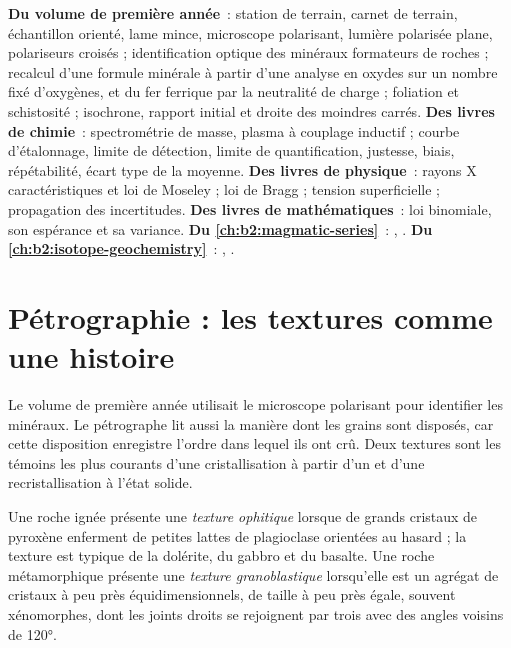 \begin{recall}
\textbf{Du volume de première année}~: station de terrain, carnet de terrain, échantillon orienté, lame mince,
microscope polarisant, lumière polarisée plane, polariseurs croisés ; identification optique des minéraux
formateurs de roches ; recalcul d'une formule minérale à partir d'une analyse en oxydes sur un nombre fixé
d'oxygènes, et du fer ferrique par la neutralité de charge ; foliation et schistosité ; isochrone, rapport
initial et droite des moindres carrés. \textbf{Des livres de chimie}~: spectrométrie de masse, plasma à
couplage inductif ; courbe d'étalonnage, limite de détection, limite de quantification, justesse, biais,
répétabilité, écart type de la moyenne. \textbf{Des livres de physique}~: rayons X caractéristiques et loi de
Moseley ; loi de Bragg ; tension superficielle ; propagation des incertitudes.
\textbf{Des livres de mathématiques}~: loi binomiale, son espérance et sa variance.
\textbf{Du \cref{ch:b2:magmatic-series}}~: , .
\textbf{Du \cref{ch:b2:isotope-geochemistry}}~: , .
\end{recall}

\section{Pétrographie : les textures comme une histoire}\label{sec:b2:field-lab-methods-2:petrography}

Le volume de première année utilisait le microscope polarisant pour identifier les minéraux. Le pétrographe lit
aussi la manière dont les grains sont disposés, car cette disposition enregistre l'ordre dans lequel ils ont
crû. Deux textures sont les témoins les plus courants d'une cristallisation à partir d'un  et
d'une recristallisation à l'état solide.

\begin{definition}\label{def:b2:field-lab-methods-2:textures}
Une roche ignée présente une \emph{texture ophitique} lorsque de grands cristaux de pyroxène
enferment de petites lattes de plagioclase orientées au hasard ; la texture est typique de la dolérite, du gabbro
et du basalte. Une roche métamorphique présente une \emph{texture granoblastique} lorsqu'elle est
un agrégat de cristaux à peu près équidimensionnels, de taille à peu près égale, souvent xénomorphes, dont les
joints droits se rejoignent par trois avec des angles voisins de \ang{120}.
\end{definition}

